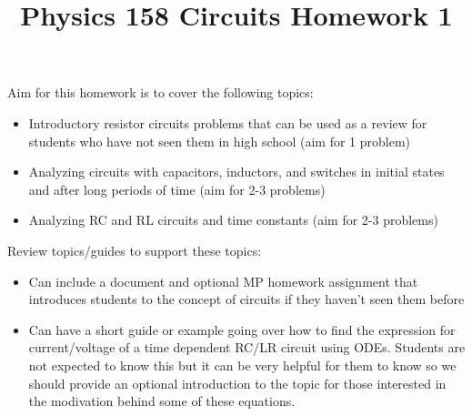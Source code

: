 \documentclass[11pt, fleqn]{article}
\title{Physics 158 Circuits Homework 1}
\author{}
\date{}
\begin{document}
\allowdisplaybreaks

\maketitle

Aim for this homework is to cover the following topics:
\begin{itemize}
    \item Introductory resistor circuits problems that can be used as a review for students who have not seen them in high school (aim for 1 problem)
    \item Analyzing circuits with capacitors, inductors, and switches in initial states and after long periods of time (aim for 2-3 problems)
    \item Analyzing RC and RL circuits and time constants (aim for 2-3 problems)
\end{itemize}

Review topics/guides to support these topics:
\begin{itemize}
    \item Can include a document and optional MP homework assignment that introduces students to the concept of circuits if they haven't seen them before
    \item Can have a short guide or example going over how to find the expression for current/voltage of a time dependent RC/LR circuit using ODEs. Students are not expected to know this but it can be very helpful for them to know so we should provide an optional introduction to the topic for those interested in the modivation behind some of these equations.
\end{itemize}

\end{document}
